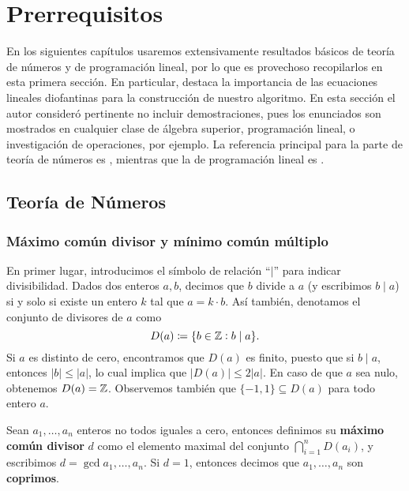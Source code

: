 \section{Prerrequisitos}
\label{sec:prerreq}
\noindent
En los siguientes capítulos usaremos extensivamente resultados básicos de teoría de números y de
programación lineal, por lo que es provechoso recopilarlos en esta primera sección. En
particular, destaca la importancia de las ecuaciones lineales diofantinas para la construcción
de nuestro algoritmo. En esta sección el autor consideró pertinente no incluir demostraciones, pues los
enunciados son mostrados en cualquier clase de álgebra superior, programación lineal, o
investigación de operaciones, por ejemplo. La referencia principal para la parte de teoría de
números es \cite{carmen}, mientras que la de programación lineal es \cite{fabs}.

\subsection{Teoría de Números}
\label{section:number-theory}
\subsubsection{Máximo común divisor y mínimo común múltiplo}
\noindent
En primer lugar, introducimos el símbolo de relación ``$\mid$'' para indicar divisibilidad. Dados
dos enteros $a, b$, decimos que $b$ divide a $a$ (y escribimos $b \mid a$) si y solo si existe un
entero $k$ tal que $a = k \cdot b$. Así también, denotamos el conjunto de divisores de $a$ como
\begin{equation*}
	D(a) \coloneq \lbrace b \in \mathbb{Z} \vcentcolon b \mid a \rbrace.
\end{equation*}
Si $a$ es distinto de cero, encontramos que $D(a)$ es finito, puesto que si $b \mid a$, entonces
$|b| \leq |a|$, lo cual implica que $|D(a)| \leq 2|a|$. En caso de que $a$ sea nulo, obtenemos $D(a)
= \mathbb{Z}$. Observemos también que $\lbrace -1, 1 \rbrace \subseteq D(a)$ para todo entero $a$.

\begin{definition}
	\label{prerreq:def:gcd}
	Sean $a_1, \ldots, a_n$ enteros no todos iguales a cero, entonces definimos su \textbf{máximo
	común divisor} $d$ como el elemento maximal del conjunto $\bigcap_{i=1}^{n}D(a_i)$, y escribimos
	$d = \gcd{a_1, \ldots, a_n}$. Si $d = 1$, entonces decimos que $a_1, \ldots, a_n$ son
	\textbf{coprimos}.
\end{definition}


